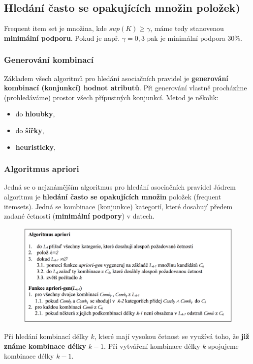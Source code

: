 \subsection{Hledání často se opakujících množin položek)}
Frequent item set je množina, kde $sup(K) \geq \gamma$, máme tedy stanovenou \textbf{minimální podporu}. Pokud je např. $\gamma = 0,3$ pak je minimální podpora 30\%.

\subsubsection{Generování kombinací}
Základem všech algoritmů pro hledání asociačních pravidel je \textbf{generování kombinací (konjunkcí) hodnot atributů}. Při generování vlastně procházíme (prohledáváme) prostor všech přípustných konjunkcí. Metod je několik:
\begin{itemize}
\item do \textbf{hloubky},
\item do \textbf{šířky},
\item \textbf{heuristicky},
\end{itemize}

\subsubsection{Algoritmus apriori}
Jedná se o nejznámějším algoritmus pro hledání asociačních pravidel Jádrem algoritmu je \textbf{hledání často se opakujících množin} položek (frequent itemsets). Jedná se kombinace (konjunkce) kategorií, které dosahují předem zadané četnosti (\textbf{minimální podpory}) v datech.

\begin{figure}[H]
	\centering
	\includegraphics[width=\textwidth]{assets/apriori.png}
\end{figure}

Při hledání kombinací délky $ k $, které mají vysokou četnost se využívá toho, že \textbf{již známe kombinace délky} $ k-1 $. Při vytváření kombinace délky $ k $ spojujeme kombinace délky $ k-1 $.

